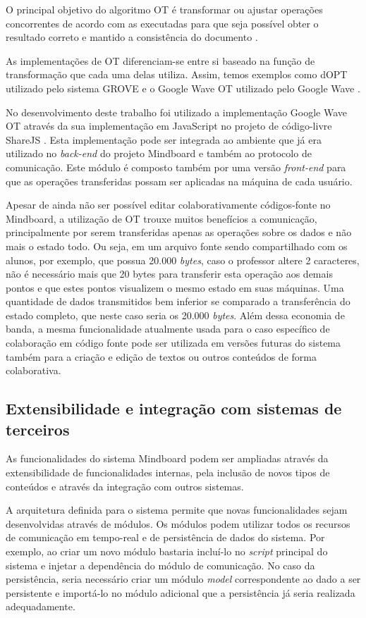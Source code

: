 O principal objetivo do algoritmo OT é transformar ou ajustar operações concorrentes de acordo com as executadas para que seja possível obter o resultado correto e mantido a consistência do documento \cite{ot}.

As implementações de OT diferenciam-se entre si baseado na função de transformação que cada uma delas utiliza. Assim, temos exemplos como dOPT utilizado pelo sistema GROVE \cite{ot} e o Google Wave OT utilizado pelo Google Wave \cite{ot2}. 

No desenvolvimento deste trabalho foi utilizado a implementação Google Wave OT através da sua implementação em JavaScript no projeto de código-livre ShareJS \cite{sharejs}. Esta implementação pode ser integrada ao ambiente que já era utilizado no \emph{back-end} do projeto Mindboard e também ao protocolo de comunicação. Este módulo é composto também por uma versão \emph{front-end} para que as operações transferidas possam ser aplicadas na máquina de cada usuário. 

Apesar de ainda não ser possível editar colaborativamente códigos-fonte no Mindboard, a utilização de OT trouxe muitos benefícios a comunicação, principalmente por serem transferidas apenas as operações sobre os dados e não mais o estado todo. Ou seja, em um arquivo fonte sendo compartilhado com os alunos, por exemplo, que possua 20.000 \emph{bytes}, caso o professor altere 2 caracteres, não é necessário mais que 20 bytes para transferir esta operação aos demais pontos e que estes pontos visualizem o mesmo estado em suas máquinas. Uma quantidade de dados transmitidos bem inferior se comparado a transferência do estado completo, que neste caso seria os 20.000 \emph{bytes}. Além dessa economia de banda, a mesma funcionalidade atualmente usada para o caso específico de colaboração em código fonte pode ser utilizada em versões futuras do sistema também para a criação e edição de textos ou outros conteúdos de forma colaborativa.

\subsection{Extensibilidade e integração com sistemas de terceiros}
\label{sec:extensibilidade}

As funcionalidades do sistema Mindboard podem ser ampliadas através da extensibilidade de funcionalidades internas, pela inclusão de novos tipos de conteúdos e através da integração com outros sistemas.

A arquitetura definida para o sistema permite que novas funcionalidades sejam desenvolvidas através de módulos. Os módulos podem utilizar todos os recursos de comunicação em tempo-real e de persistência de dados do sistema. Por exemplo, ao criar um novo módulo bastaria incluí-lo no \emph{script} principal do sistema e injetar a dependência do módulo de comunicação. No caso da persistência, seria necessário criar um módulo \emph{model} correspondente ao dado a ser persistente e importá-lo no módulo adicional que a persistência já seria realizada adequadamente.

